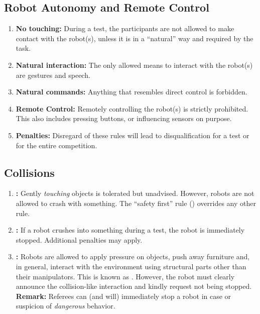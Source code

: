 \subsection{Robot Autonomy and Remote Control}
\begin{enumerate}
	\item \textbf{No touching:} During a test, the participants are not allowed to make contact with the robot(s), unless it is in a \enquote{natural} way and required by the task.

	\item \textbf{Natural interaction:} The only allowed means to interact with the robot(s) are gestures and speech.

	\item \textbf{Natural commands:} Anything that resembles direct control is forbidden.

	\item \textbf{Remote Control:} Remotely controlling the robot(s) is strictly prohibited.
	This also includes pressing buttons, or influencing sensors on purpose.

	\item \textbf{Penalties:} Disregard of these rules will lead to disqualification for a test or for the entire competition.
\end{enumerate}



\subsection{Collisions}
\begin{enumerate}
	\item \textbf{:} Gently \emph{touching} objects is tolerated but unadvised.
	However, robots are not allowed to crash with something.
	The \enquote{safety first} rule () overrides any other rule.

	\item \textbf{:} If a robot crushes into something during a test, the robot is immediately stopped.	Additional penalties may apply.

	\item \textbf{:} Robots are allowed to apply pressure on objects, push away furniture and, in general, interact with the environment using structural parts other than their manipulators.
	This is known as .
	However, the robot must clearly announce the collision-like interaction and kindly request not being stopped.\\
	\textbf{Remark: } Referees can (and will) immediately stop a robot in case or suspicion of \emph{dangerous} behavior.
\end{enumerate}



